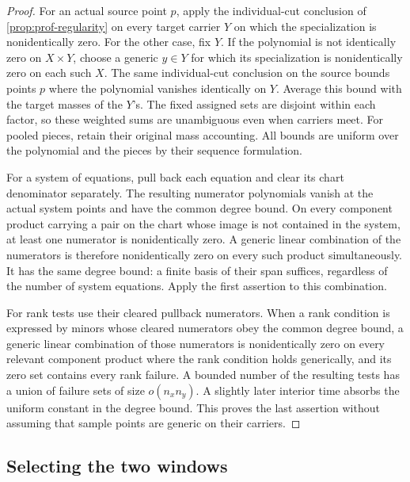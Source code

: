 \begin{proof}
For an actual source point $p$, apply the individual-cut conclusion of \cref{prop:prof-regularity} on every target carrier $Y$ on which the specialization is nonidentically zero. For the other case, fix $Y$.  If the polynomial is not identically zero on $X\times Y$, choose a generic $y\in Y$ for which its specialization is nonidentically zero on each such $X$. The same individual-cut conclusion on the source bounds points $p$ where the polynomial vanishes identically on $Y$.  Average this bound with the target masses of the $Y$'s. The fixed assigned sets are disjoint within each factor, so these weighted sums are unambiguous even when carriers meet. For pooled pieces, retain their original mass accounting. All bounds are uniform over the polynomial and the pieces by their sequence formulation.

For a system of equations, pull back each equation and clear its chart denominator separately. The resulting numerator polynomials vanish at the actual system points and have the common degree bound. On every component product carrying a pair on the chart whose image is not contained in the system, at least one numerator is nonidentically zero. A generic linear combination of the numerators is therefore nonidentically zero on every such product simultaneously. It has the same degree bound: a finite basis of their span suffices, regardless of the number of system equations. Apply the first assertion to this combination.

For rank tests use their cleared pullback numerators. When a rank condition is expressed by minors whose cleared numerators obey the common degree bound, a generic linear combination of those numerators is nonidentically zero on every relevant component product where the rank condition holds generically, and its zero set contains every rank failure. A bounded number of the resulting tests has a union of failure sets of size $o(n_xn_y)$. A slightly later interior time absorbs the uniform constant in the degree bound. This proves the last assertion without assuming that sample points are generic on their carriers.
\end{proof}

\subsection{Selecting the two windows}

